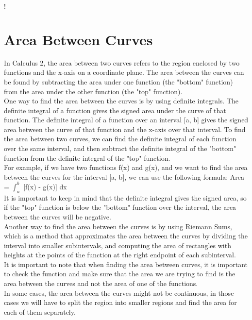 !
\section{Area Between Curves}
In Calculus 2, the area between two curves refers to the region enclosed by two 
functions and the x-axis on a coordinate plane. The area between the curves can 
be found by subtracting the area under one function (the "bottom" function) from 
the area under the other function (the "top" function).\\

One way to find the area between the curves is by using definite integrals. The 
definite integral of a function gives the signed area under the curve of that 
function. The definite integral of a function over an interval [a, b] gives the 
signed area between the curve of that function and the x-axis over that 
interval. To find the area between two curves, we can find the definite integral 
of each function over the same interval, and then subtract the definite integral 
of the "bottom" function from the definite integral of the "top" function.\\

For example, if we have two functions f(x) and g(x), and we want to find the 
area between the curves for the interval [a, b], we can use the following 
formula: Area = $\int_{a}^{b}$ [f(x) - g(x)] dx\\

It is important to keep in mind that the definite integral gives the signed 
area, so if the "top" function is below the "bottom" function over the interval, 
the area between the curves will be negative.\\

Another way to find the area between the curves is by using Riemann Sums, which 
is a method that approximates the area between the curves by dividing the 
interval into smaller subintervals, and computing the area of rectangles with 
heights at the points of the function at the right endpoint of each 
subinterval.\\

It is important to note that when finding the area between curves, it is 
important to check the function and make sure that the area we are trying to 
find is the area between the curves and not the area of one of the functions.\\

In some cases, the area between the curves might not be continuous, in those 
cases we will have to split the region into smaller regions and find the area 
for each of them separately.\\

